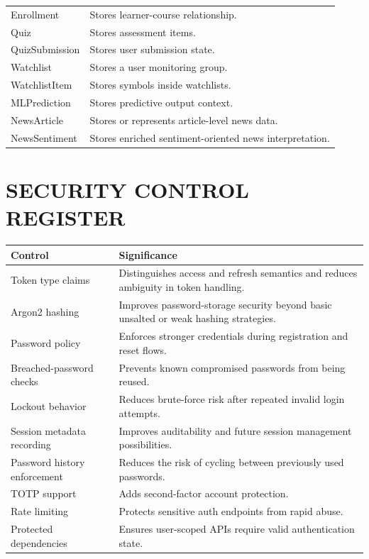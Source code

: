 \documentclass[12pt,a4paper]{report}
\begin{document}
\begin{longtable}{p{} p{}}
Enrollment & Stores learner-course relationship. \\
Quiz & Stores assessment items. \\
QuizSubmission & Stores user submission state. \\
Watchlist & Stores a user monitoring group. \\
WatchlistItem & Stores symbols inside watchlists. \\
MLPrediction & Stores predictive output context. \\
NewsArticle & Stores or represents article-level news data. \\
NewsSentiment & Stores enriched sentiment-oriented news interpretation. \\
\end{longtable}

\chapter{SECURITY CONTROL REGISTER}
\begin{longtable}{p{} p{}}
\textbf{Control} & \textbf{Significance} \\
\hline
Token type claims & Distinguishes access and refresh semantics and reduces ambiguity in token handling. \\
Argon2 hashing & Improves password-storage security beyond basic unsalted or weak hashing strategies. \\
Password policy & Enforces stronger credentials during registration and reset flows. \\
Breached-password checks & Prevents known compromised passwords from being reused. \\
Lockout behavior & Reduces brute-force risk after repeated invalid login attempts. \\
Session metadata recording & Improves auditability and future session management possibilities. \\
Password history enforcement & Reduces the risk of cycling between previously used passwords. \\
TOTP support & Adds second-factor account protection. \\
Rate limiting & Protects sensitive auth endpoints from rapid abuse. \\
Protected dependencies & Ensures user-scoped APIs require valid authentication state. \\
\end{longtable}
\end{document}
